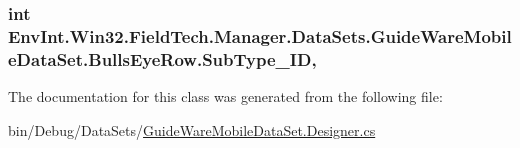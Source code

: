 \subsubsection[{Sub\+Type\+\_\+\+I\+D}]{\setlength{\rightskip}{0pt plus 5cm}int Env\+Int.\+Win32.\+Field\+Tech.\+Manager.\+Data\+Sets.\+Guide\+Ware\+Mobile\+Data\+Set.\+Bulls\+Eye\+Row.\+Sub\+Type\+\_\+\+I\+D\hspace{0.3cm}{\ttfamily [get]}, {\ttfamily [set]}}\label{class_env_int_1_1_win32_1_1_field_tech_1_1_manager_1_1_data_sets_1_1_guide_ware_mobile_data_set_1_1_bulls_eye_row_a923648a9e0803a6672fc927fb5bdccb5}


The documentation for this class was generated from the following file\+:\begin{DoxyCompactItemize}
\item 
bin/\+Debug/\+Data\+Sets/\hyperlink{bin_2_debug_2_data_sets_2_guide_ware_mobile_data_set_8_designer_8cs}{Guide\+Ware\+Mobile\+Data\+Set.\+Designer.\+cs}\end{DoxyCompactItemize}
